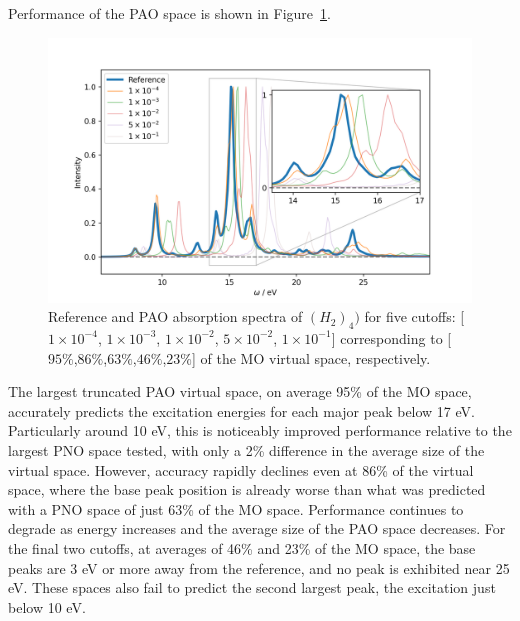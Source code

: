Performance of the PAO space is shown in Figure~\ref{fig:pao_abs}. 
\begin{figure} 
    \centering
    \includegraphics[scale=.6]{p3/figures/pao_abs.png}
    \caption{Reference and PAO absorption spectra of $(H_2)_4)$ for five cutoffs: 
    [$1\times 10^{-4}$, $1\times 10^{-3}$, $1\times 10^{-2}$, $5\times 10^{-2}$, 
    $1\times 10^{-1}$] corresponding to [$95\%$,$86\%$,$63\%$,$46\%$,$23\%$]
    of the MO virtual space, respectively.}
    \label{fig:pao_abs}
\end{figure}
The largest truncated PAO virtual space, on average 95\% of the MO space, accurately 
predicts the excitation energies for each major peak below 17 eV. Particularly around 10 eV, 
this is noticeably improved performance relative to the largest PNO space tested, 
with only a 2\% difference in the average size of the virtual space. 
However, accuracy rapidly declines even at 86\% of the virtual space, where the base peak
position is already worse than what was predicted with a PNO space of just 63\% of the 
MO space. Performance continues to degrade as energy increases and the average size of 
the PAO space decreases. For the final two cutoffs, at averages of 46\% and 23\% of the
MO space, the base peaks are 3 eV or more away from the reference, and no peak is 
exhibited near 25 eV. These spaces also fail to predict the second largest peak, the 
excitation just below 10 eV. 

